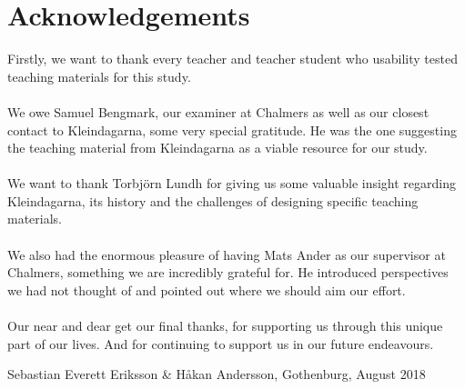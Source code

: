 \thispagestyle{plain}			%
\section*{Acknowledgements}
Firstly, we want to thank every teacher and teacher student who usability tested teaching materials for this study.
\\ \\
We owe Samuel Bengmark, our examiner at Chalmers as well as our closest contact to Kleindagarna, some very special gratitude. He was the one suggesting the teaching material from Kleindagarna as a viable resource for our study.
\\ \\
We want to thank Torbjörn Lundh for giving us some valuable insight regarding Kleindagarna, its history and the challenges of designing specific teaching materials.
\\ \\
We also had the enormous pleasure of having Mats Ander as our supervisor at Chalmers, something we are incredibly grateful for. He introduced perspectives we had not thought of and pointed out where we should aim our effort.
\\ \\
Our near and dear get our final thanks, for supporting us through this unique part of our lives. And for continuing to support us in our future endeavours.

\vspace{1.5cm}
\hfill
Sebastian Everett Eriksson \& Håkan Andersson, Gothenburg, August 2018

\newpage				%
\thispagestyle{empty}
\mbox{}